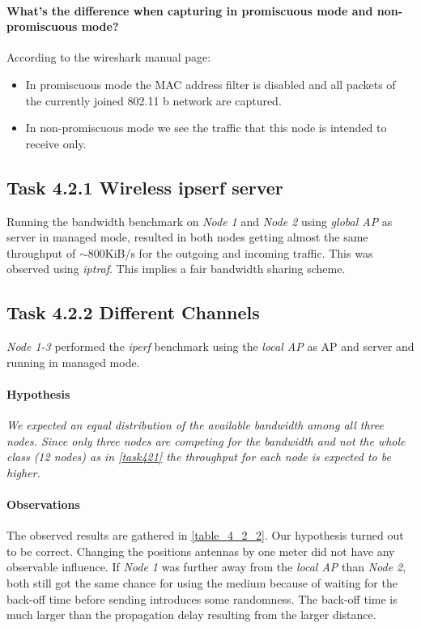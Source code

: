 \documentclass[12pt,a4paper]{article}
\begin{document}
\paragraph{What's the difference when capturing in promiscuous mode and non-promiscuous mode?}
According to the wireshark manual page\cite{wireshark:man}:
\begin{itemize}
	\item In promiscuous mode the MAC address filter is disabled and all packets of the currently joined 802.11 b network are captured.

	\item In non-promiscuous mode we see the traffic that this node is intended to receive only.

\end{itemize}

\subsection{Task 4.2.1 Wireless ipserf server}\label{task421}
Running the bandwidth benchmark on \emph{Node 1} and \emph{Node 2 }using \emph{global AP} as server in managed mode, resulted in both nodes getting almost the same throughput of $\sim800$KiB/s for the outgoing and incoming traffic. This was observed using \emph{iptraf}.
This implies a fair bandwidth sharing scheme.

\subsection{Task 4.2.2 Different Channels}\label{task422}
\emph{Node 1-3} performed the \emph{iperf} benchmark using the \emph{local AP} as AP and server and running in managed mode.
\paragraph{Hypothesis}
\textit{We expected an equal distribution of the available bandwidth among all three nodes. Since only three nodes are competing for the bandwidth and not the whole class (12 nodes) as in \autoref{task421} the throughput for each node is expected to be higher.}

\paragraph{Observations}
The observed results are gathered in \autoref{table_4_2_2}.
Our hypothesis turned out to be correct.
Changing the positions antennas by one meter did not have any observable influence. If \emph{Node 1} was further away from the \emph{local AP} than \emph{Node 2}, both still got the same chance for using the medium because of waiting for the back-off time before sending introduces some randomness. The back-off time is much larger than the propagation delay resulting from the larger distance.
\end{document}
